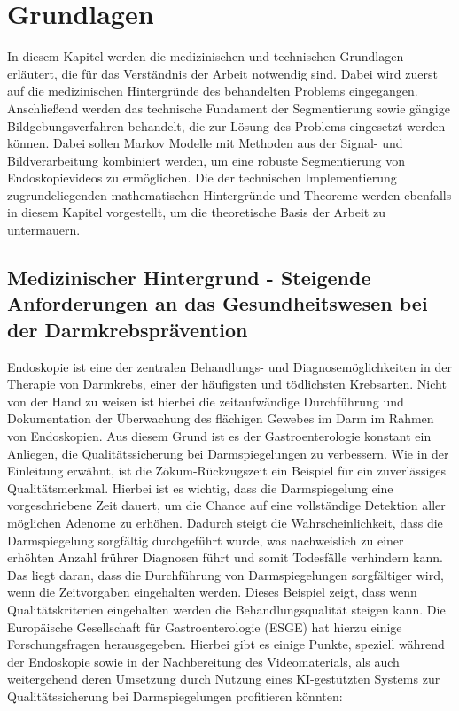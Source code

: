 \chapter{Grundlagen}\label{ch:preliminaries}

In diesem Kapitel werden die medizinischen und technischen Grundlagen erläutert, die für das Verständnis der Arbeit notwendig sind.
Dabei wird zuerst auf die medizinischen Hintergründe des behandelten Problems eingegangen.
Anschließend werden das technische Fundament der Segmentierung sowie gängige Bildgebungsverfahren behandelt, die zur Lösung des Problems eingesetzt werden können.
Dabei sollen Markov Modelle mit Methoden aus der Signal- und Bildverarbeitung kombiniert werden, um eine robuste Segmentierung von Endoskopievideos zu ermöglichen.
Die der technischen Implementierung zugrundeliegenden mathematischen Hintergründe und Theoreme werden ebenfalls in diesem Kapitel vorgestellt, um die theoretische Basis der Arbeit zu untermauern.

\section{Medizinischer Hintergrund - Steigende Anforderungen an das Gesundheitswesen bei der Darmkrebsprävention}
Endoskopie ist eine der zentralen Behandlungs- und Diagnosemöglichkeiten in der Therapie von Darmkrebs, 
einer der häufigsten und tödlichsten Krebsarten.\citep{labianca2010-colon-cancer}\footnotemark{} 
Nicht von der Hand zu weisen ist hierbei die zeitaufwändige Durchführung und 
Dokumentation der Überwachung des flächigen Gewebes im Darm im Rahmen von Endoskopien. Aus diesem Grund ist es 
der Gastroenterologie konstant ein Anliegen, die Qualitätssicherung bei Darmspiegelungen zu verbessern. 
Wie in der Einleitung erwähnt, ist die Zökum-Rückzugszeit ein Beispiel für ein zuverlässiges Qualitätsmerkmal.  Hierbei ist es wichtig, dass die Darmspiegelung eine vorgeschriebene Zeit dauert, um die Chance auf eine vollständige Detektion aller möglichen Adenome zu erhöhen. 
Dadurch steigt die Wahrscheinlichkeit, dass die Darmspiegelung sorgfältig durchgeführt wurde, was nachweislich zu einer 
erhöhten Anzahl frührer Diagnosen führt und somit Todesfälle verhindern kann. Das liegt daran, dass die Durchführung von Darmspiegelungen sorgfältiger wird, wenn 
die Zeitvorgaben eingehalten werden.
Dieses Beispiel zeigt, dass wenn Qualitätskriterien eingehalten werden die Behandlungsqualität steigen kann. 
Die Europäische Gesellschaft für Gastroenterologie (ESGE) hat hierzu einige Forschungsfragen herausgegeben. Hierbei gibt es einige Punkte, speziell während der Endoskopie sowie in der Nachbereitung des Videomaterials, als auch weitergehend deren Umsetzung durch Nutzung eines KI-gestützten Systems zur Qualitätssicherung bei Darmspiegelungen profitieren könnten:


